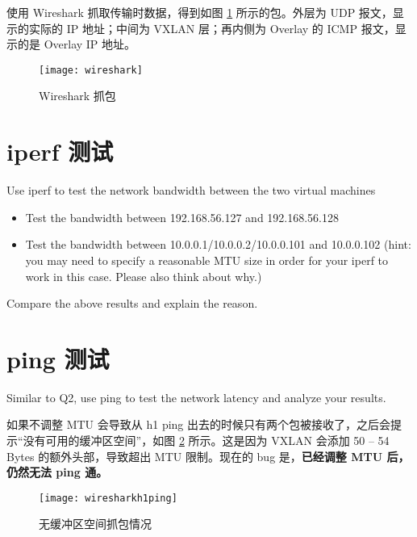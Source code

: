     使用 Wireshark 抓取传输时数据，得到如图 \ref{fig:wireshark} 所示的包。外层为 UDP 报文，显示的实际的 IP 地址；中间为 VXLAN 层；再内侧为 Overlay 的 ICMP 报文，显示的是 Overlay IP 地址。

    \begin{figure}[H]
        \centering
        \texttt{[image: wireshark]}
        \caption{Wireshark 抓包}\label{fig:wireshark}
    \end{figure}

    \section{iperf 测试}
    Use iperf to test the network bandwidth between the two virtual machines 
    \begin{itemize}
        \item Test the bandwidth between 192.168.56.127 and 192.168.56.128
        \item Test the bandwidth between 10.0.0.1/10.0.0.2/10.0.0.101 and 10.0.0.102 (hint: you may need to specify a reasonable MTU size in order for your iperf to work in this case. Please also think about why.)
    \end{itemize}

    Compare the above results and explain the reason. 



    \section{ping 测试}
    Similar to Q2, use ping to test the network latency and analyze your results.

    如果不调整 MTU 会导致从 h1 ping 出去的时候只有两个包被接收了，之后会提示“没有可用的缓冲区空间”，如图 \ref{fig:wiresharkh1ping} 所示。这是因为 VXLAN 会添加 50 -- 54 Bytes 的额外头部，导致超出 MTU 限制。现在的 bug 是，\textbf{已经调整 MTU 后，仍然无法 ping 通。}

    \begin{figure}[H]
        \centering
        \texttt{[image: wiresharkh1ping]}
        \caption{无缓冲区空间抓包情况}\label{fig:wiresharkh1ping}
    \end{figure}

